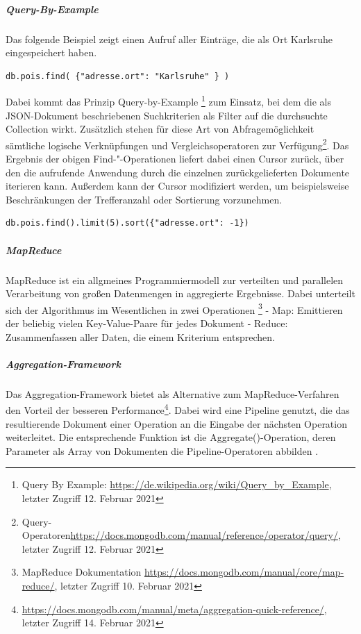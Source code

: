 \noindent
\subparagraph{Query-By-Example}
Das folgende Beispiel zeigt einen Aufruf aller Einträge, die als Ort Karlsruhe eingespeichert haben. 
\newline
\begin{lstlisting}[caption=MongoDB Read, label=lst:MongoDBRead]
db.pois.find( {"adresse.ort": "Karlsruhe" } )
\end{lstlisting}

\noindent
Dabei kommt das Prinzip Query-by-Example \footnote{Query By Example: \url{https://de.wikipedia.org/wiki/Query_by_Example}, letzter Zugriff 12. Februar 2021} zum Einsatz, bei dem die als JSON-Dokument beschriebenen Suchkriterien als Filter auf die durchsuchte Collection wirkt. Zusätzlich stehen für diese Art von Abfragemöglichkeit sämtliche logische Verknüpfungen und Vergleichsoperatoren zur Verfügung\footnote{Query-Operatoren\url{https://docs.mongodb.com/manual/reference/operator/query/}, letzter Zugriff 12. Februar 2021}.
Das Ergebnis der obigen Find-"-Operationen liefert dabei einen Cursor zurück, über den die aufrufende Anwendung durch die einzelnen zurückgelieferten Dokumente iterieren kann. Außerdem kann der Cursor modifiziert werden, um beispielsweise Beschränkungen der Trefferanzahl oder Sortierung vorzunehmen.
\newline
\begin{lstlisting}[caption=MongoDB Read Modifikation, label=lst:MongoDBReadModifikation]
db.pois.find().limit(5).sort({"adresse.ort": -1})
\end{lstlisting}

\noindent
\subparagraph{MapReduce}
MapReduce ist ein allgmeines Programmiermodell zur verteilten und parallelen Verarbeitung von großen Datenmengen in aggregierte Ergebnisse. Dabei unterteilt sich der Algorithmus im Wesentlichen in zwei Operationen \footnote{MapReduce Dokumentation \url{https://docs.mongodb.com/manual/core/map-reduce/}, letzter Zugriff 10. Februar 2021}
\newline
-	Map: Emittieren der beliebig vielen Key-Value-Paare für jedes Dokument
\newline
-	Reduce: Zusammenfassen aller Daten, die einem Kriterium entsprechen.

\noindent
\subparagraph{Aggregation-Framework}
Das Aggregation-Framework bietet als Alternative zum MapReduce-Verfahren den Vorteil der besseren Performance\footnote{\url{https://docs.mongodb.com/manual/meta/aggregation-quick-reference/}, letzter Zugriff 14. Februar 2021}. Dabei wird eine Pipeline genutzt, die das resultierende Dokument einer Operation an die Eingabe der nächsten Operation weiterleitet. Die entsprechende Funktion ist die Aggregate()-Operation, deren Parameter als Array von Dokumenten die Pipeline-Operatoren abbilden .
\newline 


